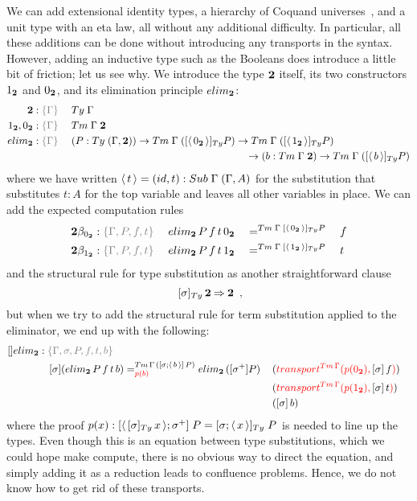 \documentclass[a4paper,UKenglish,numberwithinsect,cleveref,thm-restate]{lipics-v2021}
\begin{document}
We can add extensional identity types, a hierarchy of Coquand universes~\cite{Coquand2018}, and a unit type with an eta law, all without any additional difficulty. In particular, all these additions can be done without introducing any transports in the syntax. However, adding an inductive type such as the Booleans does introduce a little bit of friction; let us see why. We introduce the type $\mathbf{2}$ itself, its two constructors ${1_{\mathbf{2}}}$ and ${0_{\mathbf{2}}}$, and its elimination principle $\belim$:
%
\begin{alignat*}{3}
  \bool     &: \implicit{\Gamma}         \;  && \Ty\;\Gamma \\
  \btrue, \bfalse &: \implicit{\Gamma}   \;  && \Tm\;\Gamma\;\bool \\
  \belim &: \implicit{\Gamma} \; && (P : \Ty\;(\Gamma , \bool)) \to \Tm\;\Gamma\;([ \instSub{\bfalse} ]_{\Ty} P) \to \Tm\;\Gamma\;([ \instSub{\btrue} ]_{\Ty} P) \\
  &&& \qquad\qquad\qquad\qquad\qquad\qquad\qquad\qquad\quad \to (b : \Tm\;\Gamma\;\bool) \to \Tm\;\Gamma\;([ \instSub{b} ]_{\Ty} P)
\end{alignat*}
%
where we have written $\instSub{t} = (\idS, t) : \Sub\;\Gamma\;(\Gamma, A)$ for the substitution that substitutes $t : A$ for the top variable and leaves all other variables in place. We can add the expected computation rules
%
\begin{alignat*}{5}
  \bool\beta_{\bfalse}           & : \implicit{\Gamma, P, f, t}\; && \belim\,P\,f\,t\,\bfalse && =^{\Tm\;\Gamma\;[\instSub{\bfalse}]_{\Ty} P} {} && f \\
  \bool\beta_{\btrue}           & : \implicit{\Gamma, P, f, t}\; && \belim\,P\,f\,t\,\btrue && =^{\Tm\;\Gamma\;[\instSub{\btrue}]_{\Ty} P} {} && t
\end{alignat*}
%
and the structural rule for type substitution as another straightforward clause
\[
  \;[ \sigma ]_{\Ty}\,\bool \reduce \bool \enspace ,
\]
but when we try to add the structural rule for term substitution applied to the eliminator, we end up with the following:
%
\begin{alignat*}{5}
  []\belim & : \implicit{\Gamma, \sigma, P, f, t, b}\; \\ & \quad [ \sigma ] (\belim\,P\,f\,t\,b) =^{\Tm\,\Gamma\,([ \sigma; \instSub{b} ]\,P)}_{\alert{p(b)}} \belim\,([ \sigma^+ ] P)\,&&(\alert{\transfib{\Tm\,\Gamma}{p(\bfalse)}{\textcolor{black}{[ \sigma ]\,f}}}) \\&&&(\alert{\transfib{\Tm\,\Gamma}{p(\btrue)}{\textcolor{black}{[ \sigma ]\,t}}})\\&&&([\sigma ]\,b)
\end{alignat*}
where the proof $p(x) : [ \instSub{[ \sigma ]_{\Ty}\,x} ; \sigma^+ ]\;P = [ \sigma ; \instSub{x} ]_{\Ty}\;P$ is needed to line up the types. Even though this is an equation between type substitutions, which we could hope make compute, there is no obvious way to direct the equation, and simply adding it as a reduction leads to confluence problems. Hence, we do not know how to get rid of these transports.
\end{document}
